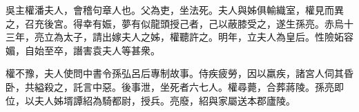 \begin{pinyinscope}
 
 
 吳主權潘夫人，會稽句章人也。父為吏，坐法死。夫人與姊俱輸織室，權見而異之，召充後宮。得幸有娠，夢有似龍頭授己者，己以蔽膝受之，遂生孫亮。赤烏十三年，亮立為太子，請出嫁夫人之姊，權聽許之。明年，立夫人為皇后。性險妬容媚，自始至卒，譖害袁夫人等甚衆。
 
 
 權不豫，夫人使問中書令孫弘呂后專制故事。侍疾疲勞，因以羸疾，諸宮人伺其昏卧，共縊殺之，託言中惡。後事泄，坐死者六七人。權尋薨，合葬蔣陵。孫亮即位，以夫人姊壻譚紹為騎都尉，授兵。亮廢，紹與家屬送本郡廬陵。
 
 
\end{pinyinscope}
